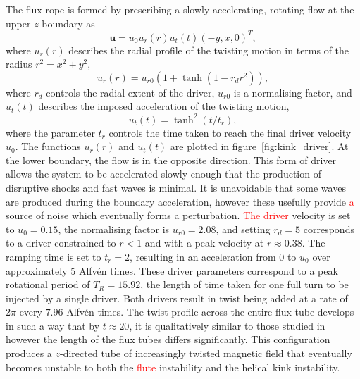 \documentclass[12pt]{article}
\newcommand{\rs}[2]{\textcolor{red}{#2}}
\renewcommand{\vec}[1]{{\bm #1}}
\begin{document}
The flux rope is formed by prescribing a slowly accelerating, rotating flow at the upper $z$-boundary as
\begin{equation}
  \label{eq:null_twisting_profile}
  \vec{u} = u_0 u_r(r) u_t(t) (-y, x, 0)^T,
\end{equation}
where $u_r(r)$ describes the radial profile of the twisting motion in terms of the radius $r^2 = x^2 + y^2$,
\begin{equation}
  \label{eq:radial_twisting_function}
  u_r(r) = u_{r0}(1 + \tanh(1 - r_d r^2)),
\end{equation}
where $r_d$ controls the radial extent of the driver, $u_{r0}$ is a normalising factor, and $u_t(t)$ describes the imposed acceleration of the twisting motion,
\begin{equation}
  \label{eq:ramping_up_function}
  u_t(t) = \tanh^2(t/t_r),
\end{equation}
where the parameter $t_r$ controls the time taken to reach the final driver velocity $u_0$. The functions $u_r(r)$ and $u_t(t)$ are plotted in figure~\ref{fig:kink_driver}. At the lower boundary, the flow is in the opposite direction. This form of driver allows the system to be accelerated slowly enough that the production of disruptive shocks and fast waves is minimal. It is unavoidable that some waves are produced during the boundary acceleration, however these usefully provide \rs{one}{a} source of noise which eventually forms a perturbation.
\rs{}{
The driver} velocity is set to $u_0 = 0.15$, the normalising factor is $u_{r0} = 2.08$, and setting $r_d = 5$ corresponds to a driver constrained to $r<1$ and with a peak velocity at $r\approx 0.38$. The ramping time is set to $t_r = 2$, resulting in an acceleration from $0$ to $u_0$ over approximately $5$ Alfv\'en times. These driver parameters correspond to a peak rotational period of $T_R = 15.92$, the length of time taken for one full turn to be injected by a single driver. Both drivers result in twist being added at a rate of $2\pi$ every $7.96$ Alfv\'en times. The twist profile across the entire flux tube develops in such a way that by $t\approx 20$, it is qualitatively similar to those studied in~\cite{quinnEffectAnisotropicViscosity2020a,hoodCoronalHeatingMagnetic2009,barefordShockHeatingNumerical2015} however the length of the flux tubes differs significantly. This configuration produces a $z$-directed tube of increasingly twisted magnetic field that eventually becomes unstable to both the \rs{fluting}{flute} instability and the helical kink instability.
\end{document}

